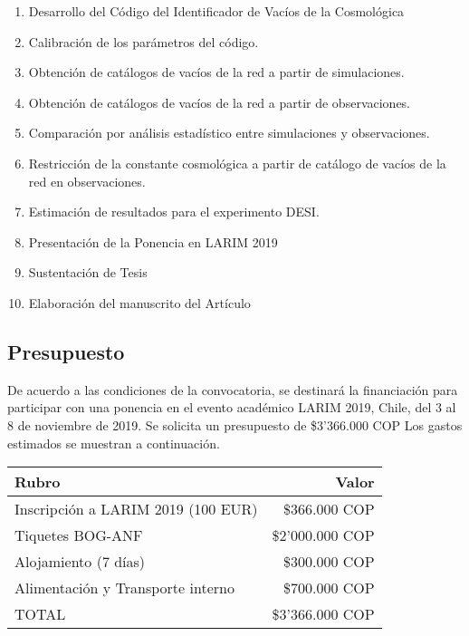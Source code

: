 \documentclass[manuscript]{aastex62}
\begin{document}
\begin{enumerate}
\item Desarrollo del Código del Identificador de Vacíos de la Cosmológica
\item Calibración de los parámetros del código.
\item Obtención de catálogos de vacíos de la red a partir de simulaciones.
\item Obtención de catálogos de vacíos de la red a partir de observaciones.
\item Comparación por análisis estadístico entre simulaciones y observaciones.
\item Restricción de la constante cosmológica a partir de catálogo de vacíos de la red en
    observaciones.
\item Estimación de resultados para el experimento DESI.
\item Presentación de la Ponencia en LARIM 2019
\item Sustentación de Tesis
\item Elaboración del manuscrito del Artículo
\end{enumerate}

\subsection{Presupuesto}

De acuerdo a las condiciones de la convocatoria, se destinará la financiación para
participar con una ponencia en el evento académico LARIM 2019, Chile, del 3 al 8 de
noviembre de 2019.
Se solicita un presupuesto de \$3'366.000 COP
Los gastos estimados
se muestran a continuación.

\begin{table}[h]
\centering
\begin{tabular}{lr}
Rubro                               & Valor  \\ \hline
Inscripción a LARIM 2019 (100 EUR)  &   \$366.000 COP   \\
Tiquetes BOG-ANF                    & \$2'000.000 COP \\
Alojamiento  (7 días)               &   \$300.000 COP \\
Alimentación y Transporte interno   &   \$700.000 COP \\ \hline
TOTAL                               & \$3'366.000 COP \\
\end{tabular}
\end{table}
\end{document}
